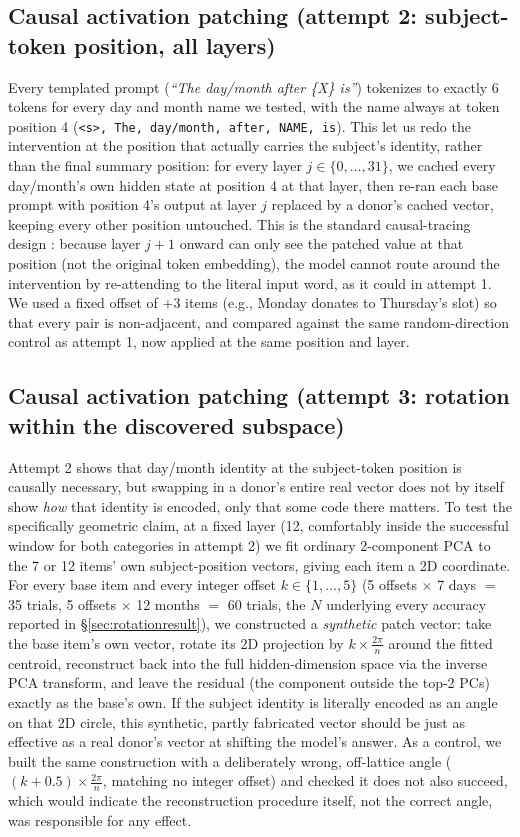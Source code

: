 \documentclass[11pt]{article}
\begin{document}
\subsection{Causal activation patching (attempt 2: subject-token position, all layers)}
\label{sec:causaltrace2}
Every templated prompt (\emph{``The day/month after \{X\} is''}) tokenizes to
exactly 6 tokens for every day and month name we tested, with the name always
at token position 4 (\texttt{<s>, The, day/month, after, NAME, is}). This
let us redo the intervention at the position that actually carries the
subject's identity, rather than the final summary position: for every layer
$j \in \{0, \ldots, 31\}$, we cached every day/month's own hidden state at
position 4 at that layer, then re-ran each base prompt with position 4's
output at layer $j$ replaced by a donor's cached vector, keeping every other
position untouched. This is the standard causal-tracing design
\cite{meng2022locating}: because layer $j{+}1$ onward can only see the patched
value at that position (not the original token embedding), the model cannot
route around the intervention by re-attending to the literal input word, as
it could in attempt 1. We used a fixed offset of $+3$ items (e.g., Monday
donates to Thursday's slot) so that every pair is non-adjacent, and compared
against the same random-direction control as attempt 1, now applied at the
same position and layer.

\subsection{Causal activation patching (attempt 3: rotation within the discovered subspace)}
\label{sec:rotationmethod}
Attempt 2 shows that day/month identity at the subject-token position is
causally necessary, but swapping in a donor's entire real vector does not by
itself show \emph{how} that identity is encoded, only that some code there
matters. To test the specifically geometric claim, at a fixed layer (12,
comfortably inside the successful window for both categories in attempt 2) we
fit ordinary 2-component PCA to the 7 or 12 items' own subject-position
vectors, giving each item a 2D coordinate. For every base item and every
integer offset $k \in \{1, \ldots, 5\}$ (5 offsets $\times$ 7 days $=$ 35
trials, 5 offsets $\times$ 12 months $=$ 60 trials, the $N$ underlying every
accuracy reported in \S\ref{sec:rotationresult}), we constructed a
\emph{synthetic} patch vector: take the base item's own vector, rotate its
2D projection by $k \times \frac{2\pi}{n}$ around the fitted centroid,
reconstruct back into the full hidden-dimension space via the inverse PCA
transform, and leave the residual (the component outside the top-2 PCs)
exactly as the base's own. If the subject identity is
literally encoded as an angle on that 2D circle, this synthetic, partly
fabricated vector should be just as effective as a real donor's vector at
shifting the model's answer. As a control, we built the same construction
with a deliberately wrong, off-lattice angle ($(k+0.5) \times \frac{2\pi}{n}$,
matching no integer offset) and checked it does not also succeed, which would
indicate the reconstruction procedure itself, not the correct angle, was
responsible for any effect.
\end{document}
